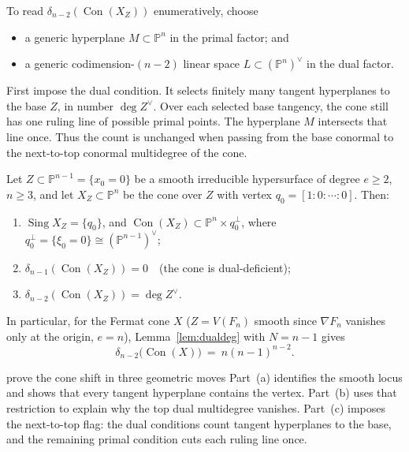 \documentclass[acmsmall,screen,nonacm]{acmart}
\theoremstyle{definition}
\theoremstyle{remark}
\DeclareMathOperator{\Sing}{Sing}
\DeclareMathOperator{\Con}{Con}
\newcommand{\PP}{\mathbb{P}}
\newcommand{\pdeg}{\delta}
\begin{document}
To read $\pdeg_{n-2}(\Con(X_Z))$ enumeratively, choose
\begin{itemize}[leftmargin=2em,itemsep=1pt]
\item a generic hyperplane $M\subset\PP^n$ in the primal factor; and
\item a generic codimension-$(n-2)$ linear space
$L\subset(\PP^n)^\vee$ in the dual factor.
\end{itemize}
First impose the dual condition.  It selects finitely many tangent
hyperplanes to the base $Z$, in number $\deg Z^\vee$.  Over each selected
base tangency, the cone still has one ruling line of possible primal points.
The hyperplane $M$ intersects that line once.  Thus the count is unchanged
when passing from the base conormal to the next-to-top conormal multidegree of
the cone.

\begin{proposition}\label{prop:coneshift}
Let $Z\subset\PP^{n-1}=\{x_0=0\}$ be a smooth irreducible hypersurface
of degree $e\ge2$, $n\ge3$, and let $X_Z\subset\PP^n$ be the cone over
$Z$ with vertex $q_0=[1:0:\cdots:0]$.  Then:
\begin{enumerate}[label=(\alph*),leftmargin=2.2em]
\item $\Sing X_Z=\{q_0\}$, and
$\Con(X_Z)\subset\PP^n\times q_0^{\perp}$, where
$q_0^\perp=\{\xi_0=0\}\cong(\PP^{n-1})^\vee$;
\item $\pdeg_{n-1}(\Con(X_Z))=0$\ \ (the cone is dual-deficient);
\item $\pdeg_{n-2}(\Con(X_Z))=\deg Z^\vee$.
\end{enumerate}
In particular, for the Fermat cone $X$ ($Z=V(F_n)$ smooth since
$\nabla F_n$ vanishes only at the origin, $e=n$),
Lemma~\ref{lem:dualdeg} with $N=n-1$ gives
\[
  \pdeg_{n-2}\big(\Con(X)\big)\ =\ n(n-1)^{n-2}.
\]
\end{proposition}

\begin{roadmapbox}{prove the cone shift in three geometric moves}
Part~(a) identifies the smooth locus and shows that every tangent hyperplane
contains the vertex.  Part~(b) uses that restriction to explain why the top
dual multidegree vanishes.  Part~(c) imposes the next-to-top flag: the dual
conditions count tangent hyperplanes to the base, and the remaining primal
condition cuts each ruling line once.
\end{roadmapbox}
\end{document}
